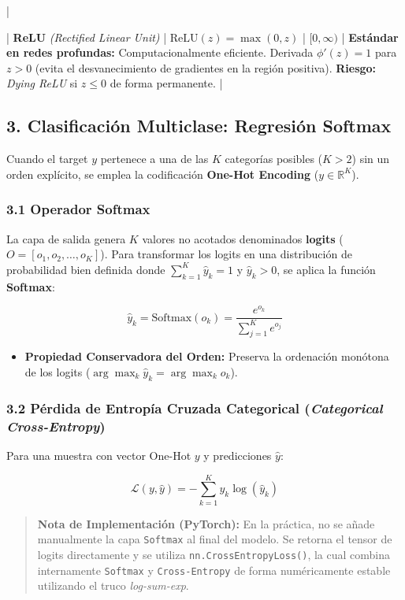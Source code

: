 \documentclass[11pt,oneside]{article}
\begin{document}
 |

| \textbf{ReLU} \emph{(Rectified Linear Unit)} | \(\text{ReLU}(z) = \max(0, z)\) | \([0, \infty)\) | \textbf{Estándar en redes profundas:} Computacionalmente eficiente. Derivada \(\phi'(z) = 1\) para \(z > 0\) (evita el desvanecimiento de gradientes en la región positiva). \textbf{Riesgo:} \emph{Dying ReLU} si \(z \le 0\) de forma permanente. |

\subsection{3. Clasificación Multiclase: Regresión Softmax}

Cuando el target \(y\) pertenece a una de las \(K\) categorías posibles (\(K > 2\)) sin un orden explícito, se emplea la codificación \textbf{One-Hot Encoding} (\(y \in \mathbb{R}^K\)).

\subsubsection{3.1 Operador Softmax}

La capa de salida genera \(K\) valores no acotados denominados \textbf{logits} (\(O = [o_1, o_2, \dots, o_K]\)). Para transformar los logits en una distribución de probabilidad bien definida donde \(\sum_{k=1}^{K} \hat{y}_k = 1\) y \(\hat{y}_k > 0\), se aplica la función \textbf{Softmax}:

\[\hat{y}_k = \text{Softmax}(o_k) = \frac{e^{o_k}}{\sum_{j=1}^{K} e^{o_j}}\]

\begin{itemize}

\item \textbf{Propiedad Conservadora del Orden:} Preserva la ordenación monótona de los logits (\(\arg\max_k \hat{y}_k = \arg\max_k o_k\)).

\end{itemize}

\subsubsection{3.2 Pérdida de Entropía Cruzada Categorical (\emph{Categorical Cross-Entropy})}

Para una muestra con vector One-Hot \(y\) y predicciones \(\hat{y}\):

\[\mathcal{L}(y, \hat{y}) = - \sum_{k=1}^{K} y_k \log(\hat{y}_k)\]

\begin{quote}\textbf{Nota de Implementación (PyTorch):} En la práctica, no se añade manualmente la capa \texttt{Softmax} al final del modelo. Se retorna el tensor de logits directamente y se utiliza \texttt{nn.CrossEntropyLoss()}, la cual combina internamente \texttt{Softmax} y \texttt{Cross-Entropy} de forma numéricamente estable utilizando el truco \emph{log-sum-exp}.\end{quote}
\end{document}
